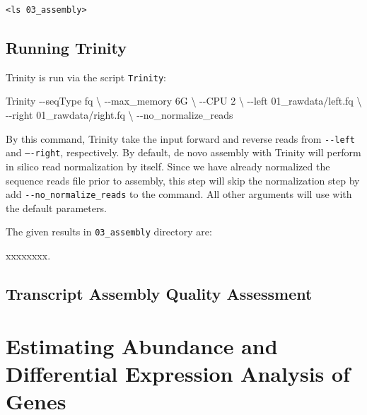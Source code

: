 \documentclass[
  letterpaper,
  DIV=11,
  numbers=noendperiod]{scrreprt}
\newenvironment{Shaded}{\begin{snugshade}}{\end{snugshade}}
\newcommand{\AttributeTok}[1]{\textcolor[rgb]{0.40,0.45,0.13}{#1}}
\newcommand{\DataTypeTok}[1]{\textcolor[rgb]{0.68,0.00,0.00}{#1}}
\newcommand{\ExtensionTok}[1]{\textcolor[rgb]{0.00,0.23,0.31}{#1}}
\newcommand{\NormalTok}[1]{\textcolor[rgb]{0.00,0.23,0.31}{#1}}
\begin{document}
\begin{verbatim}
<ls 03_assembly>
\end{verbatim}

\hypertarget{running-trinity}{%
\section{Running Trinity}\label{running-trinity}}

Trinity is run via the script \texttt{Trinity}:

\begin{Shaded}
\begin{Highlighting}[]
\ExtensionTok{Trinity} \AttributeTok{{-}{-}seqType}\NormalTok{ fq }\DataTypeTok{\textbackslash{}}
\NormalTok{{-}{-}max\_memory 6G }\DataTypeTok{\textbackslash{}}
\NormalTok{{-}{-}CPU 2 }\DataTypeTok{\textbackslash{}}
\NormalTok{{-}{-}left 01\_rawdata/left.fq }\DataTypeTok{\textbackslash{}}
\NormalTok{{-}{-}right 01\_rawdata/right.fq }\DataTypeTok{\textbackslash{}}
\NormalTok{{-}{-}no\_normalize\_reads}
\end{Highlighting}
\end{Shaded}

By this command, Trinity take the input forward and reverse reads from
\texttt{-\/-left} and \texttt{–-right}, respectively. By default, de
novo assembly with Trinity will perform in silico read normalization by
itself. Since we have already normalized the sequence reads file prior
to assembly, this step will skip the normalization step by add
\texttt{-\/-no\_normalize\_reads} to the command. All other arguments
will use with the default parameters.

The given results in \texttt{03\_assembly} directory are:

xxxxxxxx.

\hypertarget{transcript-assembly-quality-assessment}{%
\section{Transcript Assembly Quality
Assessment}\label{transcript-assembly-quality-assessment}}


\hypertarget{estimating-abundance-and-differential-expression-analysis-of-genes}{%
\chapter{Estimating Abundance and Differential Expression Analysis of
Genes}\label{estimating-abundance-and-differential-expression-analysis-of-genes}}
\end{document}
